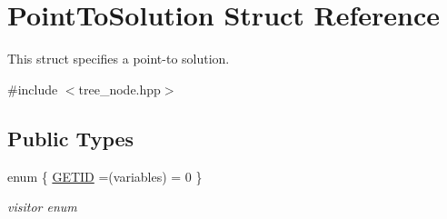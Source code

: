 \hypertarget{structPointToSolution}{}\section{Point\+To\+Solution Struct Reference}
\label{structPointToSolution}


This struct specifies a point-\/to solution.  




{\ttfamily \#include $<$tree\+\_\+node.\+hpp$>$}

\subsection*{Public Types}
\begin{DoxyCompactItemize}
\item 
enum \{ \hyperlink{structPointToSolution_a69aac44226f7ed696f4104da41f1639ca779657052580aac4c864acf56978b0b1}{G\+E\+T\+ID} =(variables) = 0
 \}\begin{DoxyCompactList}\small\item\em visitor enum \end{DoxyCompactList}
\end{DoxyCompactItemize}
